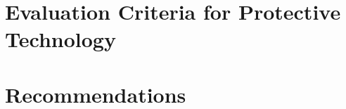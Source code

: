 \documentclass[
	final,
	titlepage,
	narroweqnarray,
	12pt
	]{ieee}
\begin{document}
\section{Evaluation Criteria for Protective Technology}








\section{Recommendations}






\pagebreak


\end{document}
